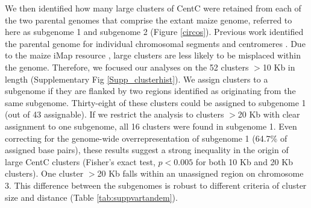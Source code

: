 We then identified how many large clusters of CentC were retained from each of the two parental genomes that comprise the extant maize genome, referred to here as subgenome 1 and subgenome 2 (Figure \ref{circos}).  
Previous work identified the parental genome for individual chromosomal segments \citep{Schnable2011} and centromeres \citep{Wang2012}.  
Due to the maize iMap resource \citep{zhou2009single}, large clusters are less likely to be misplaced within the genome.
Therefore, we focused our analyses on the 52 clusters $>$10 Kb in length (Supplementary Fig \ref{Supp_clusterhist}).
We assign clusters to a subgenome if they are flanked by two regions identified as originating from the same  subgenome.  
Thirty-eight of these clusters could be assigned to subgenome 1 (out of 43 assignable).
If we restrict the analysis to clusters  $>$20 Kb with clear assignment to one subgenome, all 16 clusters were found in subgenome 1.  
Even correcting for the genome-wide overrepresentation of subgenome 1 (64.7\% of assigned base pairs), these results suggest a strong inequality in the origin of large CentC clusters (Fisher's exact test, $p<0.005$ for both 10 Kb and 20 Kb clusters).
One cluster $>$20 Kb falls within an unassigned region on chromosome 3.
This difference between the subgenomes is robust to different criteria of cluster size and distance (Table \ref{tab:suppvartandem}).

